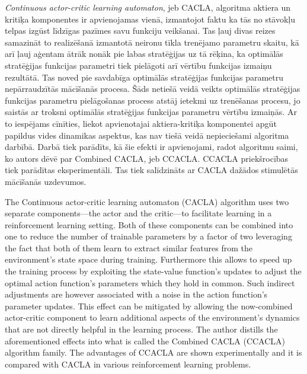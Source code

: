 \documentclass{ludis} %
\begin{document}
\maketitle

\begin{abstract-lv}
  \textit{Continuous actor-critic learning automaton}, jeb CACLA, algoritma
  aktiera un kritiķa komponentes ir apvienojamas vienā, izmantojot faktu ka tās no
  stāvokļu telpas izgūst līdzīgas pazīmes savu funkciju veikšanai. Tas ļauj divas
  reizes samazināt to realizēšanā izmantotā neironu tīkla trenējamo parametru
  skaitu, kā arī ļauj aģentam ātrāk nonāk pie labas stratēģijas uz tā rēķina, ka
  optimālās stratēģijas funkcijas parametri tiek pielāgoti arī vērtību funkcijas
  izmaiņu rezultātā. Tas noved pie savdabīga optimālās stratēģijas funkcijas
  parametru nepārraudzītās mācīšanās procesa. Šāds netiešā veidā veikts optimālās
  stratēģijas funkcijas parametru pielāgošanas process atstāj ietekmi uz
  trenēšanas procesu, jo saistās ar troksni optimālās stratēģijas funkcijas
  parametru vērtību izmaiņās. Ar to iespējams cīnīties, liekot apvienotajai
  aktiera-kritiķa komponentei apgūt papildus vides dinamikas aspektus, kas nav
  tiešā veidā nepieciešami algoritma darbībā. Darbā tiek parādīts, kā šie efekti
  ir apvienojami, radot algoritmu saimi, ko autors dēvē par Combined CACLA, jeb
  CCACLA. CCACLA priekšrocības tiek parādītas eksperimentāli. Tas tiek salīdzināts
  ar CACLA dažādos stimulētās mācīšanās uzdevumos.

\end{abstract-lv}
\clearpage

\begin{abstract-en}
  The Continuous actor-critic learning automaton (CACLA) algorithm uses two
  separate components---the actor and the critic---to facilitate learning in a
  reinforcement learning setting. Both of these components can be combined into
  one to reduce the number of trainable parameters by a factor of two leveraging
  the fact that both of them learn to extract similar features from the
  environment's state space during training. Furthermore this allows to speed up
  the training process by exploiting the state-value function's updates to
  adjust the optimal action function's parameters which they hold in common.
  Such indirect adjustments are however associated with a noise in the action
  function's parameter updates. This effect can be mitigated by allowing the
  now-combined actor-critic component to learn additional aspects of the
  environment's dynamics that are not directly helpful in the learning process.
  The author distills the aforementioned effects into what is called the
  Combined CACLA (CCACLA) algorithm family. The advantages of CCACLA are shown
  experimentally and it is compared with CACLA in various reinforcement learning
  problems.

\end{abstract-en}
\end{document}
